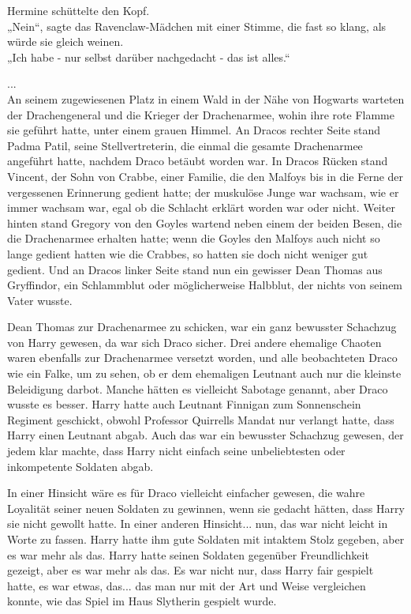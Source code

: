 {Hermine schüttelte den Kopf.\\ „Nein“, sagte das Ravenclaw-Mädchen mit einer Stimme, die fast so klang, als würde sie gleich weinen.\\ „Ich habe - nur selbst darüber nachgedacht - das ist alles.“

...\\ An seinem zugewiesenen Platz in einem Wald in der Nähe von Hogwarts warteten der Drachengeneral und die Krieger der Drachenarmee, wohin ihre rote Flamme sie geführt hatte, unter einem grauen Himmel. An Dracos rechter Seite stand Padma Patil, seine Stellvertreterin, die einmal die gesamte Drachenarmee angeführt hatte, nachdem Draco betäubt worden war. In Dracos Rücken stand Vincent, der Sohn von Crabbe, einer Familie, die den Malfoys bis in die Ferne der vergessenen Erinnerung gedient hatte; der muskulöse Junge war wachsam, wie er immer wachsam war, egal ob die Schlacht erklärt worden war oder nicht. Weiter hinten stand Gregory von den Goyles wartend neben einem der beiden Besen, die die Drachenarmee erhalten hatte; wenn die Goyles den Malfoys auch nicht so lange gedient hatten wie die Crabbes, so hatten sie doch nicht weniger gut gedient. Und an Dracos linker Seite stand nun ein gewisser Dean Thomas aus Gryffindor, ein Schlammblut oder möglicherweise Halbblut, der nichts von seinem Vater wusste.

Dean Thomas zur Drachenarmee zu schicken, war ein ganz bewusster Schachzug von Harry gewesen, da war sich Draco sicher. Drei andere ehemalige Chaoten waren ebenfalls zur Drachenarmee versetzt worden, und alle beobachteten Draco wie ein Falke, um zu sehen, ob er dem ehemaligen Leutnant auch nur die kleinste Beleidigung darbot. Manche hätten es vielleicht Sabotage genannt, aber Draco wusste es besser. Harry hatte auch Leutnant Finnigan zum Sonnenschein Regiment geschickt, obwohl Professor Quirrells Mandat nur verlangt hatte, dass Harry einen Leutnant abgab. Auch das war ein bewusster Schachzug gewesen, der jedem klar machte, dass Harry nicht einfach seine unbeliebtesten oder inkompetente Soldaten abgab.

In einer Hinsicht wäre es für Draco vielleicht einfacher gewesen, die wahre Loyalität seiner neuen Soldaten zu gewinnen, wenn sie gedacht hätten, dass Harry sie nicht gewollt hatte. In einer anderen Hinsicht... nun, das war nicht leicht in Worte zu fassen. Harry hatte ihm gute Soldaten mit intaktem Stolz gegeben, aber es war mehr als das. Harry hatte seinen Soldaten gegenüber Freundlichkeit gezeigt, aber es war mehr als das. Es war nicht nur, dass Harry fair gespielt hatte, es war etwas, das... das man nur mit der Art und Weise vergleichen konnte, wie das Spiel im Haus Slytherin gespielt wurde.

}
